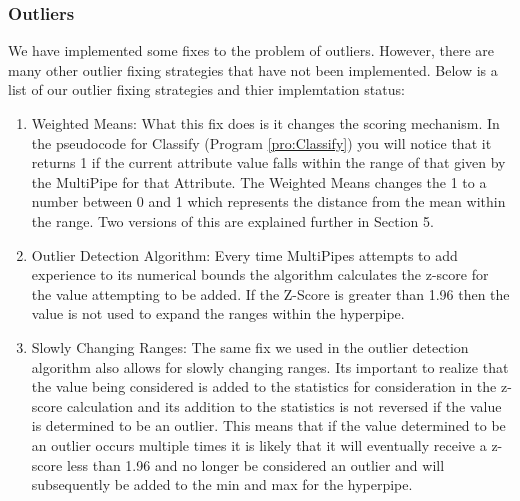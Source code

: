 \subsubsection{Outliers}
We have implemented some fixes to the problem of outliers. 
However, there are many other outlier fixing strategies that have 
not been implemented. Below is a list of our outlier fixing 
strategies and thier implemtation status:
\begin{enumerate}
\item Weighted Means: What this fix 
does is it changes the scoring mechanism. In the pseudocode for 
Classify (Program \ref{pro:Classify}) you will notice that it returns 1 if the current attribute 
value falls within the range of that given by the MultiPipe for that 
Attribute. The Weighted Means changes the 1 to a number between 0 
and 1 which represents the distance from the mean within the range. 
Two versions of this are explained further in Section 5.
\item Outlier Detection Algorithm: 
Every time MultiPipes attempts to add experience to its numerical bounds
the algorithm calculates the z-score\cite{Larsen01} for the value attempting to be added. 
If the Z-Score is greater than 1.96 then the value is not used to expand
the ranges within the hyperpipe.
\item Slowly Changing Ranges: 
The same fix we used in the outlier detection algorithm also allows for 
slowly changing ranges. Its important to realize that the value being
considered is added to the statistics for consideration in the z-score 
calculation and its addition to the statistics is not reversed if the
value is determined to be an outlier. This means that if the value 
determined to be an outlier occurs multiple times it is likely that 
it will eventually receive a z-score less than 1.96 and no longer be
considered an outlier and will subsequently be added to the min and max
for the hyperpipe.
\end{enumerate}

